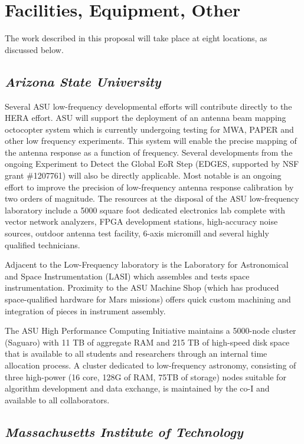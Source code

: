 \documentclass[11pt]{article}
\begin{document}
\pagestyle{empty}

\section*{Facilities, Equipment, Other}

The work described in this proposal will take place at eight locations, as discussed below. 

\subsection*{\it Arizona State University}

Several ASU low-frequency developmental efforts will contribute directly to the
HERA effort. ASU will support the deployment of an antenna beam mapping
octocopter system which is currently undergoing testing for MWA, PAPER and
other low frequency experiments. This system will enable the precise mapping of
the antenna response as a function of frequency. Several developments from the
ongoing Experiment to Detect the Global EoR Step (EDGES, supported by NSF grant
\#1207761) will also be directly applicable.  Most notable is an ongoing effort
to improve the precision of low-frequency antenna response calibration by two
orders of magnitude. The resources at the disposal of the ASU low-frequency laboratory
include a 5000 square foot dedicated electronics lab complete with vector
network analyzers, FPGA development stations, high-accuracy noise sources,
outdoor antenna test facility, 6-axis micromill and several highly qualified
technicians.

Adjacent to the Low-Frequency laboratory is the Laboratory for Astronomical and Space
Instrumentation (LASI) which assembles and tests space instrumentation.
Proximity to the ASU Machine Shop (which has produced space-qualified hardware
for Mars missions) offers quick custom machining and integration of pieces in
instrument assembly. 

The ASU High Performance Computing Initiative maintains a 5000-node cluster
(Saguaro) with 11 TB of aggregate RAM and 215 TB of high-speed disk space that
is available to all students and researchers through an internal time
allocation process. A cluster dedicated to low-frequency astronomy, consisting
of three high-power (16 core, 128G of RAM, 75TB of storage) nodes suitable for
algorithm development and data exchange, is maintained by the co-I and
available to all collaborators.

\subsection*{\it Massachusetts Institute of Technology}
\end{document}
